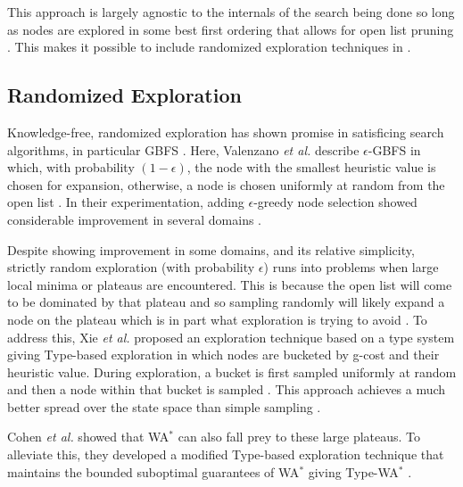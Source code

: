 This approach is largely agnostic to the internals of the search being done so long as nodes are explored in some best first ordering that allows for open list pruning \cite{hansen2007anytime}. This makes it possible to include randomized exploration techniques in \awa.

\subsection{Randomized Exploration}
Knowledge-free, randomized exploration has shown promise in satisficing search algorithms, in particular GBFS \cite{valenzano2014comparison}. Here, Valenzano \textit{et al.} describe $\epsilon$-GBFS in which, with probability $(1-\epsilon)$, the node with the smallest heuristic value is chosen for expansion, otherwise, a node is chosen uniformly at random from the open list \cite{valenzano2014comparison}. In their experimentation, adding $\epsilon$-greedy node selection showed considerable improvement in several domains \cite{valenzano2014comparison}.

Despite showing improvement in some domains, and its relative simplicity, strictly random exploration (with probability $\epsilon$) runs into problems when large local minima or plateaus are encountered. This is because the open list will come to be dominated by that plateau and so sampling randomly will likely expand a node on the plateau which is in part what exploration is trying to avoid \cite{xie2014type}\cite{cohen2021type}. To address this, Xie \textit{et al.} proposed an exploration technique based on a type system giving Type-based exploration in which nodes are bucketed by g-cost and their heuristic value. During exploration, a bucket is first sampled uniformly at random and then a node within that bucket is sampled \cite{xie2014type}. This approach achieves a much better spread over the state space than simple \egreedy sampling \cite{xie2014type}.

Cohen \textit{et al.} showed that WA$^*$ can also fall prey to these large plateaus. To alleviate this, they developed a modified Type-based exploration technique that maintains the bounded suboptimal guarantees of WA$^*$ giving Type-WA$^*$ \cite{cohen2021type}. 

